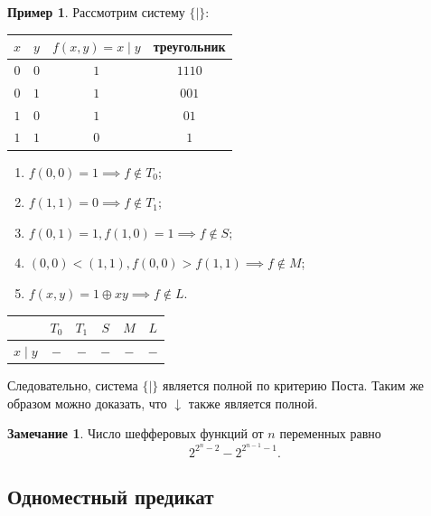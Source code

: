 \documentclass[a5paper, 11pt]{extarticle}
\theoremstyle{definition}
\newtheorem{example}{Пример}[subsection]
\theoremstyle{definition}
\theoremstyle{definition}
\newtheorem*{note*}{Замечание}
\numberwithin{figure}{section}
\numberwithin{table}{section}
\begin{document}
\begin{example}
    Рассмотрим систему \(\{\mid\}\):
    {
    \renewcommand*{\arraystretch}{1.5}
    \begin{longtable}{|c|c|c|c|}
        \hline
        \(x\) & \(y\) & \(f(x, y) = x \mid y\) & треугольник \\
        \hline
        \(0\) & \(0\) & \(1\)                  & \(1110\)    \\
        \hline
        \(0\) & \(1\) & \(1\)                  & \(001\)     \\
        \hline
        \(1\) & \(0\) & \(1\)                  & \(01\)      \\
        \hline
        \(1\) & \(1\) & \(0\)                  & \(1\)       \\
        \hline
    \end{longtable}
    }

    \begin{enumerate}
        \item \(f(0, 0) = 1 \implies f \notin T_0\);
        \item \(f(1, 1) = 0 \implies f \notin T_1\);
        \item \(f(0, 1) = 1, f(1, 0) = 1 \implies f \notin S\);
        \item \((0, 0) < (1, 1), f(0, 0) > f(1, 1) \implies f \notin M\);
        \item \(f(x, y) = 1 \oplus xy \implies f \notin L\).
    \end{enumerate}

    {
    \renewcommand*{\arraystretch}{1.5}
    \begin{longtable}{|c|c|c|c|c|c|}
        \hline
                     & \(T_0\) & \(T_1\) & \(S\) & \(M\) & \(L\) \\
        \hline
        \(x \mid y\) & \(-\)   & \(-\)   & \(-\) & \(-\) & \(-\) \\
        \hline
    \end{longtable}
    }

    Следовательно, система \(\{|\}\) является полной по критерию Поста. Таким же образом можно доказать, что \({\downarrow}\) также является полной.
\end{example}

\begin{note*}
    Число шефферовых функций от \(n\) переменных равно
    \[
        2^{2^n - 2} - 2^{2^{n - 1} - 1}.
    \]
\end{note*}

\subsection{Одноместный предикат}
\end{document}
